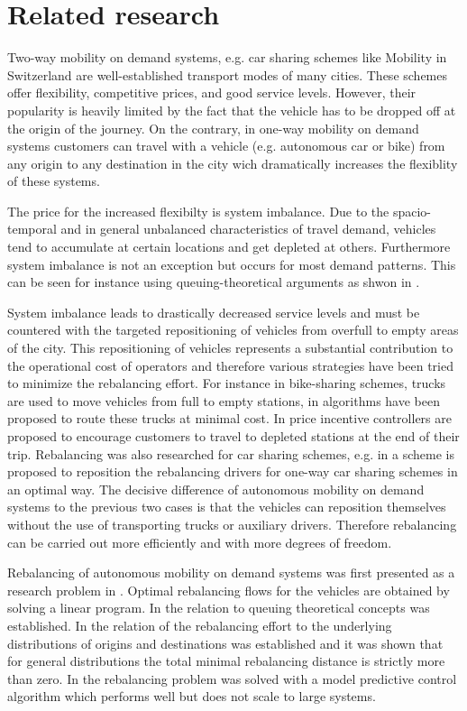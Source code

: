 \section{Related research}
\label{subs:literatureResearch}

Two-way mobility on demand systems, e.g. car sharing schemes like Mobility in
Switzerland \citep{katzev2003car} are well-established transport modes
of many cities. These schemes offer flexibility, competitive prices, and good
service levels. However, their popularity is heavily limited by the fact that
the vehicle has to be dropped off at the origin of the journey. On the contrary,
in one-way mobility on demand systems customers can travel with a vehicle (e.g.
autonomous car or bike) from any origin to any destination in the city wich
dramatically increases the flexiblity of these systems.

The price for the increased flexibilty is system imbalance. Due to the
spacio-temporal and in general unbalanced characteristics of travel demand,
vehicles tend to accumulate at certain locations and get depleted at others.
Furthermore system imbalance is not an exception but occurs for most demand
patterns. This can be seen for instance using queuing-theoretical arguments
as shwon in \citep{zhang2016control}.

System imbalance leads to drastically decreased service levels and must be
countered with the targeted repositioning of vehicles from overfull to empty
areas of the city. This repositioning of vehicles represents a substantial
contribution to the operational cost of operators and therefore various strategies
have been tried to minimize the rebalancing effort. For instance in bike-sharing
schemes, trucks are used to move vehicles from full to empty stations, in
\citep{pfrommer2014dynamic} algorithms have been proposed to route these
trucks at minimal cost. In \citep{ruch2014rule} price incentive controllers
are proposed to encourage customers to travel to depleted stations at the end
of their trip. Rebalancing was also researched for car sharing schemes, e.g.
in \citep{smith2013rebalancing} a scheme is proposed to reposition the
rebalancing drivers for one-way car sharing schemes in an optimal way. The
decisive difference of autonomous mobility on demand systems to the previous two
cases is that the vehicles can reposition themselves without the use of transporting
trucks or auxiliary drivers. Therefore rebalancing can be carried out more efficiently
and with more degrees of freedom.

Rebalancing of autonomous mobility on demand systems was first presented as a research
 problem in \citep{pavone2011load}. Optimal rebalancing flows for the vehicles are
 obtained by solving a linear program. In \citep{zhang2016control} the relation to
 queuing theoretical concepts was established. In \citep{treleaven2011asymptotically}
 the relation of the rebalancing effort to the underlying distributions of origins
 and destinations was established and it was shown that for general distributions
 the total minimal rebalancing distance is strictly more than zero.
 In   \citep{zhang2016model} the rebalancing problem was solved with a model
 predictive control algorithm which performs well but does not scale to large systems.

